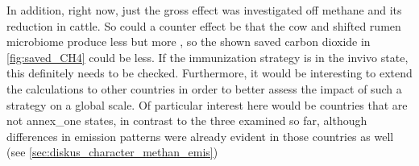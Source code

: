 In addition, right now, just the \gls{gross} effect was investigated off methane and its reduction in cattle. So could a counter effect be that the cow and shifted rumen microbiome produce less  but more , so the shown saved carbon dioxide  in \cref{fig:saved_CH4} could be less. If the immunization strategy is in the \gls{invivo} state, this definitely needs to be checked.
Furthermore, it would be interesting to extend the calculations to other countries in order to better assess the impact of such a strategy on a global scale. Of particular interest here would be countries that are not \gls{annex_one} states, in contrast to the three examined so far, although differences in emission patterns were already evident in those countries as well (see \cref{sec:diskus_character_methan_emis})